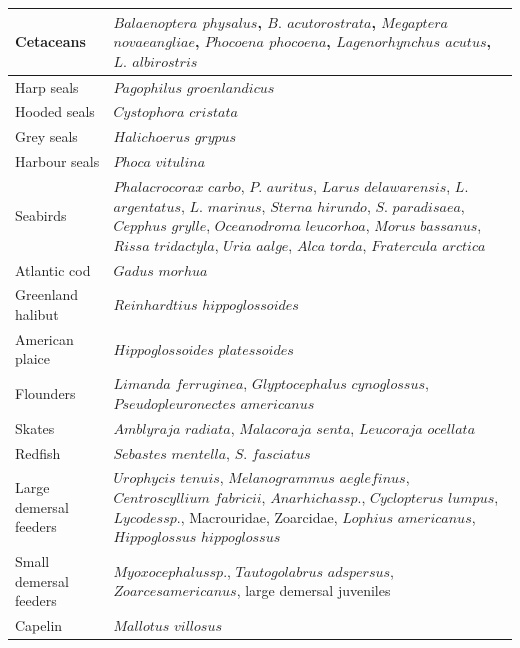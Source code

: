 \begin{singlespace}
\begin{longtable}{ p{} p{} }
        Cetaceans                          & $Balaenoptera$ $physalus$, $B.$ $acutorostrata$, $Megaptera$ $novaeangliae$, $Phocoena$ $phocoena$, $Lagenorhynchus$ $acutus$, $L.$ $albirostris$  \\
        \hline
        Harp seals                         & $Pagophilus$ $groenlandicus$   \\
        \hline
        Hooded seals                       & $Cystophora$ $cristata$    \\
        \hline
        Grey seals                         & $Halichoerus$ $grypus$ \\
        \hline
        Harbour seals                      & $Phoca$ $vitulina$ \\
        \hline
        Seabirds                           & $Phalacrocorax$ $carbo$, $P.$ $auritus$, $Larus$ $delawarensis$, $L.$ $argentatus$, $L.$ $marinus$, $Sterna$ $hirundo$, $S.$ $paradisaea$, $Cepphus$ $grylle$, $Oceanodroma$ $leucorhoa$, $Morus$ $bassanus$, $Rissa$ $tridactyla$, $Uria$ $aalge$, $Alca$ $torda$, $Fratercula$ $arctica$ \\
        \hline
        Atlantic cod                       & $Gadus$ $morhua$   \\
        \hline
        Greenland halibut                  & $Reinhardtius$ $hippoglossoides$   \\
        \hline
        American plaice                    & $Hippoglossoides$ $platessoides$   \\
        \hline
        Flounders                          & $Limanda$ $ferruginea$, $Glyptocephalus$ $cynoglossus$, $Pseudopleuronectes$ $americanus$  \\
        \hline
        Skates                             & $Amblyraja$ $radiata$, $Malacoraja$ $senta$, $Leucoraja$ $ocellata$    \\
        \hline
        Redfish                            & $Sebastes$ $mentella$, $S.$ $fasciatus$    \\
        \hline
        Large demersal feeders             & $Urophycis$ $tenuis$, $Melanogrammus$ $aeglefinus$, $Centroscyllium$ $fabricii$, $Anarhichas sp.$, $Cyclopterus$ $lumpus$, $Lycodes sp.$, Macrouridae, Zoarcidae, $Lophius$ $americanus$, $Hippoglossus$ $hippoglossus$    \\
        \hline
        Small demersal feeders             & $Myoxocephalus sp.$, $Tautogolabrus$ $adspersus$, $Zoarces americanus$, large demersal juveniles   \\
        \hline
        Capelin                            & $Mallotus$ $villosus$  \\

\end{longtable}
\end{singlespace}
